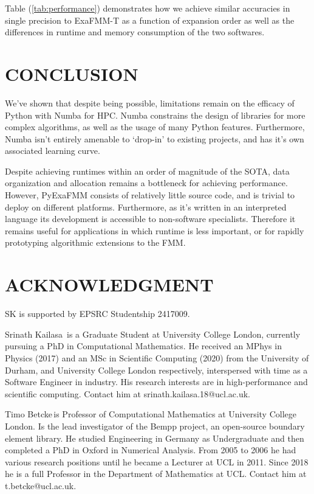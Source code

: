\documentclass{IEEEcsmag}
\begin{document}
Table (\ref{tab:performance}) demonstrates how we achieve similar accuracies in single precision to ExaFMM-T as a function of expansion order as well as the differences in runtime and memory consumption of the two softwares.

\section{CONCLUSION}

We've shown that despite being possible, limitations remain on the efficacy of Python with Numba for HPC. Numba constrains the design of libraries for more complex algorithms, as well as the usage of many Python features. Furthermore, Numba isn't entirely amenable to `drop-in' to existing projects, and has it's own associated learning curve.

Despite achieving runtimes within an order of magnitude of the SOTA, data organization and allocation remains a bottleneck for achieving performance. However, PyExaFMM consists of relatively little source code, and is trivial to deploy on different platforms. Furthermore, as it's written in an interpreted language its development is accessible to non-software specialists. Therefore it remains useful for applications in which runtime is less important, or for rapidly prototyping algorithmic extensions to the FMM.

\section{ACKNOWLEDGMENT}

SK is supported by EPSRC Studentship 2417009.




\begin{IEEEbiography}{Srinath Kailasa}{\,} is a Graduate Student at University College London, currently pursuing a PhD in Computational Mathematics. He received an MPhys in Physics (2017) and an MSc in Scientific Computing (2020) from the University of Durham, and University College London respectively, interspersed with time as a Software Engineer in industry. His research interests are in high-performance and scientific computing. Contact him at srinath.kailasa.18@ucl.ac.uk.
\end{IEEEbiography}

\begin{IEEEbiography}{Timo Betcke}{\,}is Professor of Computational Mathematics at University College London. Is the lead investigator of the Bempp project, an open-source boundary element library. He studied Engineering in Germany as Undergraduate and then completed a PhD in Oxford in Numerical Analysis. From 2005 to 2006 he had various research positions until he became a Lecturer at UCL in 2011. Since 2018 he is a full Professor in the Department of Mathematics at UCL. Contact him at t.betcke@ucl.ac.uk.
\end{IEEEbiography}
\end{document}
